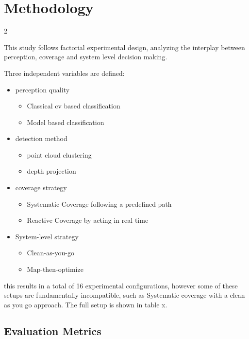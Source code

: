 \section{Methodology}
\begin{paracol}
{2}

This study follows factorial experimental design, analyzing the interplay between
perception, coverage and system level decision making.

Three independent variables are defined:

\begin{itemize}
\item perception quality

\begin{itemize}
\item Classical cv based classification
\item Model based classification
\end{itemize}


\item detection method

\begin{itemize}
\item point cloud clustering
\item depth projection
\end{itemize}


\item coverage strategy

\begin{itemize}
\item Systematic Coverage following a predefined path
\item Reactive Coverage by acting in real time
\end{itemize}


\item System-level strategy

\begin{itemize}
\item Clean-as-you-go
\item Map-then-optimize
\end{itemize}
\end{itemize}

this results in a total of 16 experimental configurations, however some of these setups are fundamentally incompatible, such as Systematic coverage with a clean as you go approach. The full setup is shown in table x.

\subsection{Evaluation Metrics}


\end{paracol}
